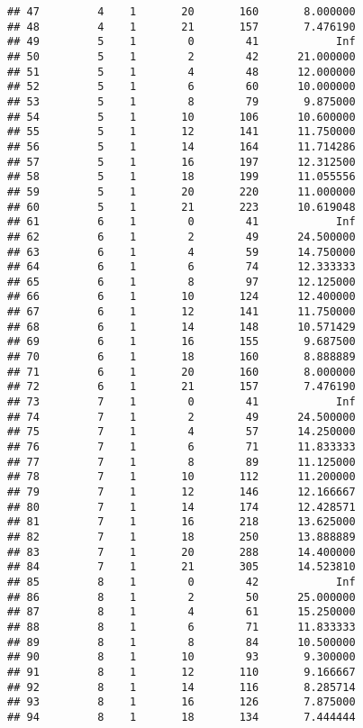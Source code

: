 \documentclass[
]{article}
\begin{document}
\begin{verbatim}
## 47         4    1       20       160       8.000000
## 48         4    1       21       157       7.476190
## 49         5    1        0        41            Inf
## 50         5    1        2        42      21.000000
## 51         5    1        4        48      12.000000
## 52         5    1        6        60      10.000000
## 53         5    1        8        79       9.875000
## 54         5    1       10       106      10.600000
## 55         5    1       12       141      11.750000
## 56         5    1       14       164      11.714286
## 57         5    1       16       197      12.312500
## 58         5    1       18       199      11.055556
## 59         5    1       20       220      11.000000
## 60         5    1       21       223      10.619048
## 61         6    1        0        41            Inf
## 62         6    1        2        49      24.500000
## 63         6    1        4        59      14.750000
## 64         6    1        6        74      12.333333
## 65         6    1        8        97      12.125000
## 66         6    1       10       124      12.400000
## 67         6    1       12       141      11.750000
## 68         6    1       14       148      10.571429
## 69         6    1       16       155       9.687500
## 70         6    1       18       160       8.888889
## 71         6    1       20       160       8.000000
## 72         6    1       21       157       7.476190
## 73         7    1        0        41            Inf
## 74         7    1        2        49      24.500000
## 75         7    1        4        57      14.250000
## 76         7    1        6        71      11.833333
## 77         7    1        8        89      11.125000
## 78         7    1       10       112      11.200000
## 79         7    1       12       146      12.166667
## 80         7    1       14       174      12.428571
## 81         7    1       16       218      13.625000
## 82         7    1       18       250      13.888889
## 83         7    1       20       288      14.400000
## 84         7    1       21       305      14.523810
## 85         8    1        0        42            Inf
## 86         8    1        2        50      25.000000
## 87         8    1        4        61      15.250000
## 88         8    1        6        71      11.833333
## 89         8    1        8        84      10.500000
## 90         8    1       10        93       9.300000
## 91         8    1       12       110       9.166667
## 92         8    1       14       116       8.285714
## 93         8    1       16       126       7.875000
## 94         8    1       18       134       7.444444

\end{verbatim}
\end{document}
